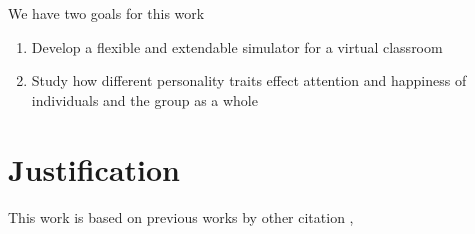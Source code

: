 \bb

We have two goals for this work
\begin{enumerate}
    \item Develop a flexible and extendable simulator for a virtual classroom
    \item Study how different personality traits effect attention and happiness of individuals and the group as a whole
\end{enumerate}



\section{Justification}

This work is based on previous works by \cite{Schelling1971}
other citation \cite{Tissue2004}, \cite{Tissue2004}